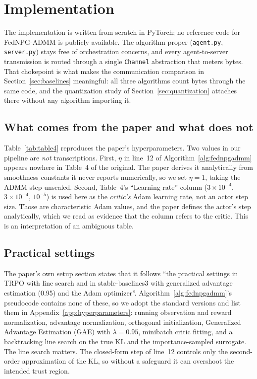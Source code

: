 \section{Implementation}
\label{sec:implementation}

The implementation is written from scratch in PyTorch; no reference code for
FedNPG-ADMM is publicly available. The algorithm proper (\texttt{agent.py},
\texttt{server.py}) stays free of orchestration concerns, and every
agent-to-server transmission is routed through a single \texttt{Channel}
abstraction that meters bytes. That chokepoint is what makes the communication
comparison in Section~\ref{sec:baselines} meaningful: all three algorithms
count bytes through the same code, and the quantization study of
Section~\ref{sec:quantization} attaches there without any algorithm importing
it.

\subsection{What comes from the paper and what does not}

Table~\ref{tab:table4} reproduces the paper's hyperparameters. Two values in
our pipeline are \emph{not} transcriptions. First, $\eta$ in line~12 of
Algorithm~\ref{alg:fednpgadmm} appears nowhere in Table~4 of the original. The
paper derives it analytically from smoothness constants it never reports
numerically, so we set $\eta = 1$, taking the ADMM step unscaled. Second,
Table~4's ``Learning rate'' column ($3\times10^{-4}$, $3\times10^{-4}$,
$10^{-5}$) is used here as the \emph{critic's} Adam learning rate, not an
actor step size. Those are characteristic Adam values, and the paper defines
the actor's step analytically, which we read as evidence that the column
refers to the critic. This is an interpretation of an ambiguous table.

\subsection{Practical settings}

The paper's own setup section states that it follows ``the practical settings
in TRPO with line search and in stable-baselines3 with generalized advantage
estimation (0.95) and the Adam optimizer''. Algorithm~\ref{alg:fednpgadmm}'s
pseudocode contains none of these, so we adopt the standard versions and list
them in Appendix~\ref{app:hyperparameters}: running observation and reward
normalization, advantage normalization, orthogonal initialization, Generalized Advantage
Estimation (GAE) with $\lambda = 0.95$, minibatch critic fitting, and a backtracking line search on
the true KL and the importance-sampled surrogate. The line search matters. The
closed-form step of line~12 controls only the second-order approximation of
the KL, so without a safeguard it can overshoot the intended trust region.

